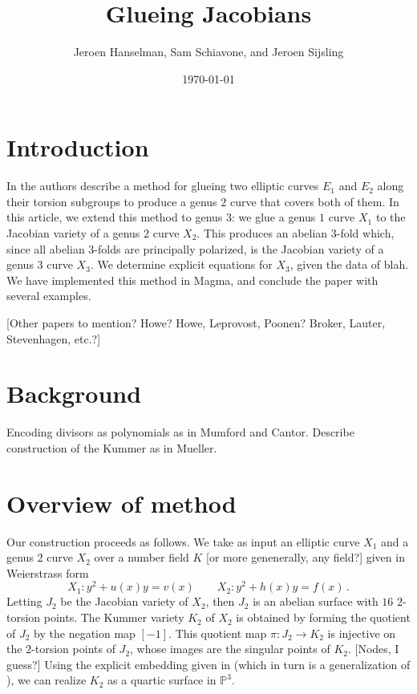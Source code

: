 \documentclass[reqno, 12pt]{amsart}
\theoremstyle{definition}
\renewcommand{\P}{\mathbb P}
\newcommand{\sss}[1]{{\color{blue} [#1]}}
\begin{document}
\title{Glueing Jacobians}
\author{Jeroen Hanselman, Sam Schiavone, and Jeroen Sijsling}
\date{\today}

\maketitle

\tableofcontents

\section{Introduction}
In \cite{FreyKani}
the authors describe a method for glueing two elliptic curves $E_1$ and $E_2$ along their torsion subgroups to produce a genus $2$ curve that covers both of them. In this article, we extend this method to genus $3$: we glue a genus $1$ curve $X_1$ to the Jacobian variety of a genus $2$ curve $X_2$. This produces an abelian $3$-fold which, since all abelian $3$-folds are principally polarized, is the Jacobian variety of a genus $3$ curve $X_3$. We determine explicit equations for $X_3$, given the data of blah. We have implemented this method in \textsf{Magma}, and conclude the paper with several examples.

\sss{Other papers to mention? Howe? Howe, Leprovost, Poonen? Broker, Lauter, Stevenhagen, etc.?}

\section{Background}

Encoding divisors as polynomials as in Mumford and Cantor. Describe construction of the Kummer as in Mueller.

\section{Overview of method}

Our construction proceeds as follows. We take as input an elliptic curve $X_1$ and a genus $2$ curve $X_2$ over a number field $K$ \sss{or more genenerally, any field?} given in Weierstrass form
$$
X_1: y^2 + u(x) y = v(x) \qquad
X_2: y^2 + h(x) y = f(x) \, .
$$
Letting $J_2$ be the Jacobian variety of $X_2$, then $J_2$ is an abelian surface with $16$ $2$-torsion points. The Kummer variety $K_2$ of $X_2$ is obtained by forming the quotient of $J_2$ by the negation map $[-1]$. This quotient map $\pi : J_2 \to K_2$ is injective on the $2$-torsion points of $J_2$, whose images are the singular points of $K_2$. \sss{Nodes, I guess?} Using  the explicit embedding given in \cite{Mueller} (which in turn is a generalization of \cite{CasselsFlynn}), we can realize $K_2$ as a quartic surface in $\P^3$.
\end{document}
